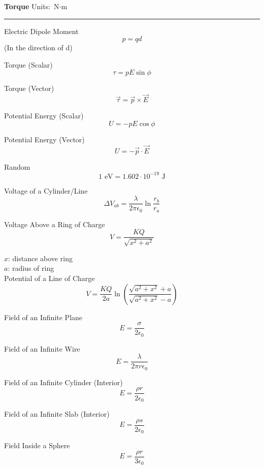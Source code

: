 \documentclass{article}
\begin{document}
\large \textbf{Torque}\normalsize \qquad
Units: $\textrm{N}\cdot\textrm{m}$\\
\noindent\rule{\textwidth}{0.5pt}
\begin{multicols}{5}

\begin{center}
    
    Electric Dipole Moment
    \[
        p = qd
    \]
    \footnotesize (In the direction of d)\normalsize
    
    \vfill\null\columnbreak
    
    Torque (Scalar)
    \[
        \tau = pE\sin\phi
    \]
    
    \vfill\null\columnbreak
    
    Torque (Vector)
    \[
        \vec{\tau} = \vec{p}\times\vec{E}
    \]
    
    \vfill\null\columnbreak
    
    Potential Energy (Scalar)
    \[
        U = -pE\cos\phi
    \]
    
    \vfill\null\columnbreak
    
    Potential Energy (Vector)
    \[
        U = -\vec{p}\cdot\vec{E}
    \]
    
    \vfill\null
    
\end{center}

\end{multicols}

\vfill\null\pagebreak
\begin{center}

Random
\[
    1\textrm{ eV} = 1.602\cdot10^{-19}\textrm{ J}
\]

Voltage of a Cylinder/Line
\[
    \Delta V_{ab} = \frac{\lambda}{2\pi\epsilon_0}\ln\frac{r_b}{r_a}
\]

Voltage Above a Ring of Charge
\[
    V = \frac{KQ}{\sqrt{x^2+a^2}}
\]

\footnotesize $x$: distance above ring\\
$a$: radius of ring\normalsize\\

Potential of a Line of Charge
\[
    V = \frac{KQ}{2a}\ln\left(\frac{\sqrt{a^2+x^2}+a}{\sqrt{a^2+x^2}-a}\right)
\]

Field of an Infinite Plane 
\[
    E = \frac{\sigma}{2\epsilon_0}
\]

Field of an Infinite Wire
\[
    E = \frac{\lambda}{2\pi r\epsilon_0}
\]

Field of an Infinite Cylinder (Interior)
\[
    E = \frac{\rho r}{2\epsilon_0}
\]

Field of an Infinite Slab (Interior)
\[
    E = \frac{\rho s}{2\epsilon_0}
\]

Field Inside a Sphere
\[
    E = \frac{\rho r}{3\epsilon_0}
\]


\end{center}
\end{document}
